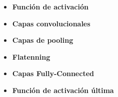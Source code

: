\begin{itemize}
    \item \textbf{Función de activación}
    \item \textbf{Capas convolucionales}
    \item \textbf{Capas de pooling}
    \item \textbf{Flatenning}
    \item \textbf{Capas Fully-Connected}
    \item \textbf{Función de activación última}
\end{itemize}












